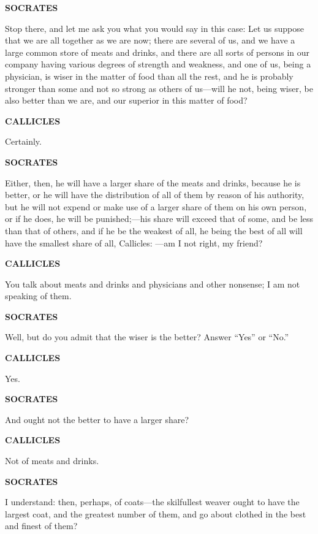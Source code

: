 \documentclass[11pt,letter]{article}
\begin{document}
\par \textbf{SOCRATES}
\par   Stop there, and let me ask you what you would say in this case:  Let us suppose that we are all together as we are now; there are several of us, and we have a large common store of meats and drinks, and there are all sorts of persons in our company having various degrees of strength and weakness, and one of us, being a physician, is wiser in the matter of food than all the rest, and he is probably stronger than some and not so strong as others of us—will he not, being wiser, be also better than we are, and our superior in this matter of food?

\par \textbf{CALLICLES}
\par   Certainly.

\par \textbf{SOCRATES}
\par   Either, then, he will have a larger share of the meats and drinks, because he is better, or he will have the distribution of all of them by reason of his authority, but he will not expend or make use of a larger share of them on his own person, or if he does, he will be punished;—his share will exceed that of some, and be less than that of others, and if he be the weakest of all, he being the best of all will have the smallest share of all, Callicles: —am I not right, my friend?

\par \textbf{CALLICLES}
\par   You talk about meats and drinks and physicians and other nonsense; I am not speaking of them.

\par \textbf{SOCRATES}
\par   Well, but do you admit that the wiser is the better? Answer “Yes” or “No.”

\par \textbf{CALLICLES}
\par   Yes.

\par \textbf{SOCRATES}
\par   And ought not the better to have a larger share?

\par \textbf{CALLICLES}
\par   Not of meats and drinks.

\par \textbf{SOCRATES}
\par   I understand:  then, perhaps, of coats—the skilfullest weaver ought to have the largest coat, and the greatest number of them, and go about clothed in the best and finest of them?
\end{document}
